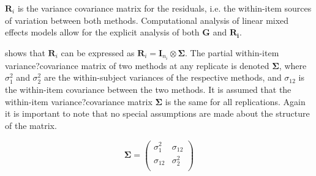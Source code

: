 \documentclass[12pt, a4paper]{report}
\theoremstyle{plain}
\theoremstyle{definition}
\theoremstyle{remark}
\begin{document}
	$\boldsymbol{R}_{i}$ is the variance covariance matrix for the residuals, i.e. the within-item sources of variation between both methods. Computational analysis of linear mixed effects models allow for the explicit analysis of both $\boldsymbol{G}$ and $\boldsymbol{R_i}$.
	
	\citet{hamlett} shows that $\boldsymbol{R}_{i}$  can be expressed as $\boldsymbol{R}_{i} = \boldsymbol{I}_{n_{i}} \otimes \boldsymbol{\Sigma}$. The partial within-item variance?covariance matrix of two methods at any replicate is denoted $\boldsymbol{\Sigma}$, where $\sigma^2_{1}$ and $\sigma^2_{2}$ are the within-subject variances of the respective methods, and $\sigma_{12}$ is the within-item covariance between the two methods. It is assumed that the within-item variance?covariance matrix $\boldsymbol{\Sigma}$ is the same for all replications. Again it is important to note that no special assumptions are made about the structure of the matrix.
	
	\begin{equation}
	\boldsymbol{\Sigma} = \left( \begin{array}{cc}
	\sigma^2_{1} & \sigma_{12} \\
	\sigma_{12} & \sigma^2_{2} \\
	\end{array}\right)
	\end{equation}
	
	\vspace{1in}
	
\end{document}
